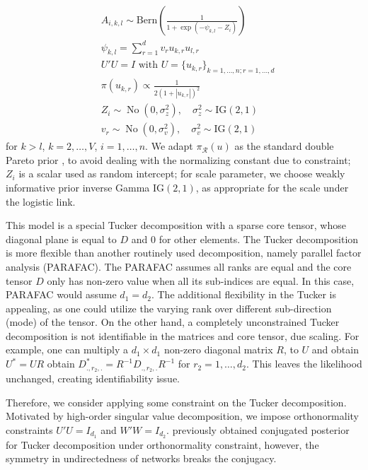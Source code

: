 \documentclass[10pt,fleqn]{article}
\newcommand{\mc}[1]{\mathcal{#1}}
\DeclareMathOperator{\No}{No}
\DeclareMathOperator{\1}{\mathbbm{1}}
\begin{document}
   \begin{equation*}
   \begin{aligned}
   & A_{i,k,l} \sim \text{Bern}( \frac{1}{1+ \exp(-\psi_{k,l}- Z_{i})})\\
   & \psi_{k,l} = \sum_{r=1}^{d}  v_{r} u_{k,r} u_{l,r}  \\
   & U'U=I \text{ with } U=\{u_{k,r}\}_{k=1,\ldots,n; r=1,\ldots,d}\\
   & \pi(u_{k,r})  \propto  \frac{1}{2(1+ |u_{k,r}|)^{2}} \\
   & Z_{i} \sim \No(0,\sigma^2_z), \quad  \sigma^2_z \sim \text{IG}(2,1)
   \\
   & v_{r} \sim \No(0,\sigma^2_v), \quad  \sigma^2_v \sim \text{IG}(2,1)
   \end{aligned}
   \end{equation*}
   for $k>l$, $k=2,\ldots, V$, $i=1,\ldots,n$. We adapt $\pi_{\mc R}(u)$ as the standard double Pareto prior \citep{armagan2013generalized}, to avoid
dealing with the normalizing constant due to constraint; $Z_i$ is a scalar
used as random intercept; for scale parameter, we
choose weakly informative prior inverse Gamma $\text{IG}(2,1)$, as appropriate for the scale under the logistic link.

   This model is a special Tucker decomposition with a sparse core tensor, whose diagonal plane is equal to $D$ and $0$ for other elements. The Tucker decomposition is more flexible than another routinely used decomposition, namely parallel factor analysis (PARAFAC). The PARAFAC assumes all ranks are equal and the core tensor $D$ only has non-zero value when all its sub-indices are equal. In this case, PARAFAC would assume $d_1=d_2$. The additional flexibility in the Tucker is appealing, as one could utilize the varying rank over different sub-direction (mode) of the tensor. On the other hand, a completely unconstrained Tucker decomposition is not identifiable in the matrices and core tensor, due scaling. For example, one can multiply a $d_1\times d_1$ non-zero diagonal matrix $R$, to $U$ and obtain $U^*=UR$ obtain $D^{*}_{.,r_2,.}=R^{-1}D_{.,r_2,.}R^{-1}$ for $r_2=1,\ldots,d_2$. This leaves the likelihood unchanged, creating identifiability issue. 

   Therefore, we consider applying some constraint on the Tucker decomposition. Motivated by high-order singular value decomposition, we impose orthonormality constraints $U'U=I_{d_1}$ and $W'W=I_{d_2}$. \cite{hoff2016equivariant} previously obtained conjugated posterior for Tucker decomposition under orthonormality constraint, however, the symmetry in undirectedness of networks breaks the conjugacy.
\end{document}
